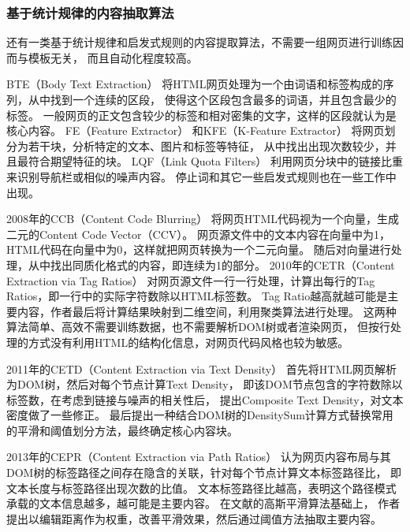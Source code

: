 \subsubsection{基于统计规律的内容抽取算法}

还有一类基于统计规律和启发式规则的内容提取算法，不需要一组网页进行训练因而与模板无关，
而且自动化程度较高。

BTE（Body Text Extraction）
将HTML网页处理为一个由词语和标签构成的序列，从中找到一个连续的区段，
使得这个区段包含最多的词语，并且包含最少的标签。
一般网页的正文包含较少的标签和相对密集的文字，这样的区段就认为是核心内容。
FE（Feature Extractor）
和KFE（K-Feature Extractor）
将网页划分为若干块，分析特定的文本、图片和标签等特征，
从中找出出现次数较少，并且最符合期望特征的块。
LQF（Link Quota Filters）
利用网页分块中的链接比重来识别导航栏或相似的噪声内容。
停止词和其它一些启发式规则也在一些工作中出现。

2008年的CCB（Content Code Blurring）
将网页HTML代码视为一个向量，生成二元的Content Code Vector（CCV）。
网页源文件中的文本内容在向量中为1，HTML代码在向量中为0，这样就把网页转换为一个二元向量。
随后对向量进行处理，从中找出同质化格式的内容，即连续为1的部分。
2010年的CETR（Content Extraction via Tag Ratios）
对网页源文件一行一行处理，计算出每行的Tag Ratios，即一行中的实际字符数除以HTML标签数。
Tag Ratio越高就越可能是主要内容，作者最后将计算结果映射到二维空间，利用聚类算法进行处理。
这两种算法简单、高效不需要训练数据，也不需要解析DOM树或者渲染网页，
但按行处理的方式没有利用HTML的结构化信息，对网页代码风格也较为敏感。

2011年的CETD（Content Extraction via Text Density）
首先将HTML网页解析为DOM树，然后对每个节点计算Text Density，
即该DOM节点包含的字符数除以标签数，在考虑到链接与噪声的相关性后，
提出Composite Text Density，对文本密度做了一些修正。
最后提出一种结合DOM树的DensitySum计算方式替换常用的平滑和阈值划分方法，最终确定核心内容块。

2013年的CEPR（Content Extraction via Path Ratios）
认为网页内容布局与其DOM树的标签路径之间存在隐含的关联，针对每个节点计算文本标签路径比，
即文本长度与标签路径出现次数的比值。
文本标签路径比越高，表明这个路径模式承载的文本信息越多，越可能是主要内容。
在文献\cite{weninger2010cetr}的高斯平滑算法基础上，
作者提出以编辑距离作为权重，改善平滑效果，然后通过阈值方法抽取主要内容。


